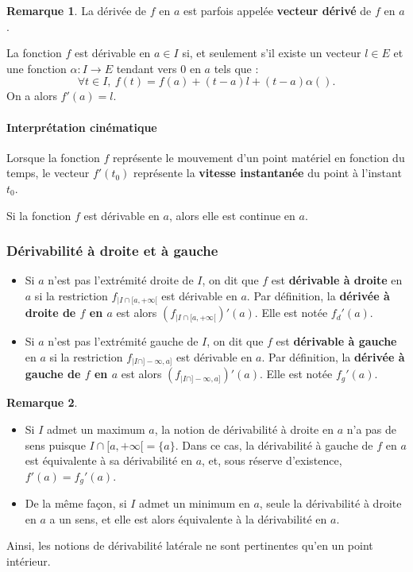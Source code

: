 \documentclass[french]{article}
\theoremstyle{plain}
\theoremstyle{definition}
\newtheorem*{rmq}{Remarque}
\theoremstyle{remark}
\begin{document}
\begin{rmq}
	La dérivée de $f$ en $a$ est parfois appelée \textbf{vecteur dérivé} de $f$ en $a$.
\end{rmq}

\begin{prop}%
	La fonction $f$ est dérivable en $a\in I$ si, et seulement s'il existe un vecteur $l\in E$ et une fonction $\alpha:I\to E$ tendant vers $0$ en $a$ tels que :
	$$\forall t\in I,\ f(t)=f(a)+(t-a)l+(t-a)\alpha().$$
	On a alors $f'(a)=l$.
\end{prop}

\paragraph{Interprétation cinématique}
Lorsque la fonction $f$ représente le mouvement d'un point matériel en fonction du temps, le vecteur $f'(t_0)$ représente la \textbf{vitesse instantanée} du point à l'instant $t_0$.

\begin{cor}%
	Si la fonction $f$ est dérivable en $a$, alors elle est continue en $a$.
\end{cor}

\subsubsection*{Dérivabilité à droite et à gauche}

\begin{dfn}
	\begin{itemize}
		\item Si $a$ n'est pas l'extrémité droite de $I$, on dit que $f$ est \textbf{dérivable à droite} en $a$ si la restriction $f_{\mid I\cap [a,+\infty[}$ est dérivable en $a$. Par définition, la \textbf{dérivée à droite de $f$ en $a$} est alors $(f_{\mid I\cap [a,+\infty[})'(a)$. Elle est notée $f_d'(a)$.
		\item Si $a$ n'est pas l'extrémité gauche de $I$, on dit que $f$ est \textbf{dérivable à gauche} en $a$ si la restriction $f_{\mid I\cap ]-\infty,a]}$ est dérivable en $a$. Par définition, la \textbf{dérivée à gauche de $f$ en $a$} est alors $(f_{\mid I\cap ]-\infty,a]})'(a)$. Elle est notée $f_g'(a)$.
	\end{itemize}
\end{dfn}

\begin{rmq}
	\begin{itemize}
		\item  Si $I$ admet un maximum $a$, la notion de dérivabilité à droite en $a$ n'a pas de sens puisque $I\cap[a,+\infty[=\{a\}$. Dans ce cas, la dérivabilité à gauche de $f$ en $a$ est équivalente à sa dérivabilité en $a$, et, sous réserve d'existence, $f'(a)=f_g'(a)$.
		\item De la même façon, si $I$ admet un minimum en $a$, seule la dérivabilité à droite en $a$ a un sens, et elle est alors équivalente à la dérivabilité en $a$.
	\end{itemize}
	Ainsi, les notions de dérivabilité latérale ne sont pertinentes qu'en un point intérieur.
\end{rmq}
\end{document}

